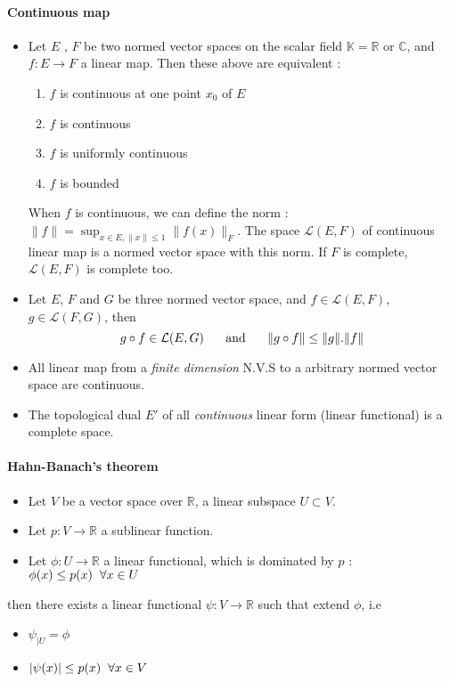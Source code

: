 \documentclass[a4paper,10pt]{article}
\begin{document}
\paragraph{Continuous map}
\begin{itemize}
 \item Let $E$ , $F$ be two normed vector spaces on the scalar field $\mathbb{K} = \mathbb{R} \text{ or } \mathbb{C} $, and $f:E\longrightarrow F$ a linear map. Then these above are equivalent :
 \begin{enumerate}
  \item $f$ is continuous at one point $x_0$ of $E$
  \item $f$ is continuous
  \item $f$ is uniformly continuous
  \item $f$ is bounded
 \end{enumerate}
 When $f$ is continuous, we can define the norm : $\|f\| = \sup_{x\in E, \|x\|\leq 1} \|f(x)\|_{F}$. The space $\mathcal{L}(E,F)$ of continuous linear map is a normed vector space with this norm. If $F$ is complete, $\mathcal{L}(E,F)$ is complete too.
 \item Let $E$, $F$ and $G$ be three normed vector space, and $f \in \mathcal{L}(E,F)$, $g \in \mathcal{L}(F,G)$, then
 \[ g\circ f \in \mathcal{L}(E,G) \hspace{5mm} \text{ and } \hspace{5mm} \| g\circ f\| \leq \|g\|.\|f\| \]
 \item All linear map from a \textit{finite dimension} N.V.S to a arbitrary normed vector space are continuous.
 \item The topological dual $E'$ of all \textit{continuous} linear form (linear functional) is a complete space.
\end{itemize}
\paragraph{Hahn-Banach's theorem} 
\begin{itemize}
\renewcommand{\labelitemi}{$\vcenter{\hbox{\tiny$\bullet$}}$}
 \item Let $V$ be a vector space over $\mathbb{R}$, a linear subspace $U \subset V$.
 \item Let $p:V\longrightarrow \mathbb{R}$ a sublinear function.
 \item Let $\phi:U\longrightarrow \mathbb{R}$ a linear functional, which is dominated by $p$ : $\phi(x)\leq p(x) \hspace{2mm} \forall x \in U$
\end{itemize}
then there exists a linear functional $\psi:V\longrightarrow \mathbb{R}$ such that extend $\phi$, i.e
\begin{itemize}
\renewcommand{\labelitemi}{$\vcenter{\hbox{\tiny$\bullet$}}$}
 \item $\psi_{|U}=\phi$
 \item $|\psi(x)| \leq p(x) \hspace{2mm} \forall x \in V $
\end{itemize}
\end{document}
